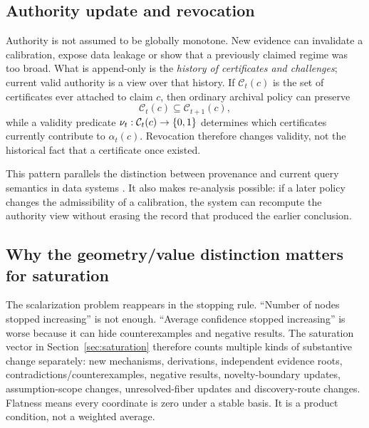 \subsection{Authority update and revocation}

Authority is not assumed to be globally monotone. New evidence can invalidate a calibration, expose data leakage or show that a previously claimed regime was too broad. What is append-only is the \emph{history of certificates and challenges}; current valid authority is a view over that history. If \(\mathcal C_t(c)\) is the set of certificates ever attached to claim \(c\), then ordinary archival policy can preserve
\[
\mathcal C_t(c)\subseteq \mathcal C_{t+1}(c),
\]
while a validity predicate \(\nu_t:\mathcal C_t(c)\to\{0,1\}\) determines which certificates currently contribute to \(\alpha_t(c)\). Revocation therefore changes validity, not the historical fact that a certificate once existed.

This pattern parallels the distinction between provenance and current query semantics in data systems \cite{buneman2001,green2007,prov2013}. It also makes re-analysis possible: if a later policy changes the admissibility of a calibration, the system can recompute the authority view without erasing the record that produced the earlier conclusion.

\subsection{Why the geometry/value distinction matters for saturation}

The scalarization problem reappears in the stopping rule. ``Number of nodes stopped increasing'' is not enough. ``Average confidence stopped increasing'' is worse because it can hide counterexamples and negative results. The saturation vector in Section~\ref{sec:saturation} therefore counts multiple kinds of substantive change separately: new mechanisms, derivations, independent evidence roots, contradictions/counterexamples, negative results, novelty-boundary updates, assumption-scope changes, unresolved-fiber updates and discovery-route changes. Flatness means every coordinate is zero under a stable basis. It is a product condition, not a weighted average.
